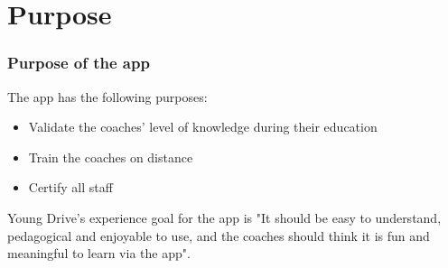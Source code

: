 \section{Purpose}

\subsubsection{Purpose of the app}
The app has the following purposes:

\begin{itemize}
  \item Validate the coaches' level of knowledge during their education
    \item Train the coaches on distance
    \item Certify all staff
\end{itemize}

Young Drive's experience goal for the app is "It should be easy to understand, pedagogical and enjoyable to use, and the coaches should think it is fun and meaningful to learn via the app".